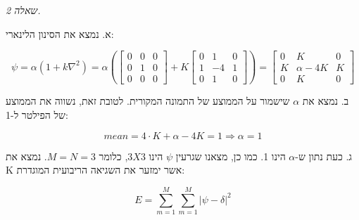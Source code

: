 \documentclass[a4paper]{iacas}
\begin{document}
\newpage
\begin{hebrew}
\textit{\huge שאלה 2.}

א. נמצא את הסינון הלינארי:
\end{hebrew}
\begin{equation*}
\psi = \alpha(1+k\nabla^2) = \alpha\left(\begin{bmatrix}0&0&0\\0&1&0\\0&0&0\end{bmatrix}+K\begin{bmatrix}0&1&0\\1&-4&1\\0&1&0\end{bmatrix}\right) = \begin{bmatrix}0&K&0\\K&\alpha-4K&K\\0&K&0\end{bmatrix}
\end{equation*}


\begin{hebrew}
ב. נמצא את $\alpha$ שישמור על הממוצע של התמונה המקורית. לטובת זאת, נשווה את הממוצע של הפילטר ל-1:
\end{hebrew}

\begin{equation*}
mean = 4\cdot K + \alpha - 4K = 1  \Longrightarrow  \alpha = 1
\end{equation*}

\begin{hebrew}
ג. כעת נתון ש-$\alpha$ הינו 1. כמו כן, מצאנו שגרעין $\psi$ הינו $3X3$, כלומר $M=N=3$. נמצא את K אשר ימזער את השגיאה הריבועית המוגדרת:
\end{hebrew}
\begin{equation*}
E = \sum_{m=1}^M \sum_{m=1}^M |\psi -\delta|^2
\end{equation*}
\end{document}
